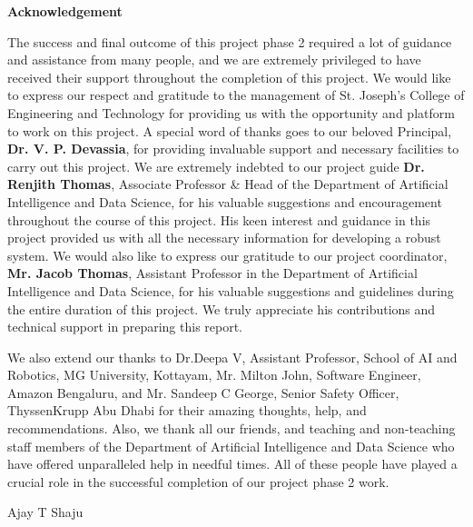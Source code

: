 {%
\newpage
\thispagestyle{empty}
\begin{center}
  \vspace*{1cm}
  \textbf{\large Acknowledgement}
\end{center}
The success and final outcome of this project phase 2 required a lot of guidance and assistance from many people, and we are extremely privileged to have received their support throughout the completion of this project. We would like to express our respect and gratitude to the management of St. Joseph’s College of Engineering and Technology for providing us with the opportunity and platform to work on this project. A special word of thanks goes to our beloved Principal, \textbf{Dr. V. P. Devassia}, for providing invaluable support and necessary facilities to carry out this project. We are extremely indebted to our project guide \textbf{Dr. Renjith Thomas}, Associate Professor \& Head of the Department of Artificial Intelligence and Data Science, for his valuable suggestions and encouragement throughout the course of this project. His keen interest and guidance in this project provided us with all the necessary information for developing a robust system. We would also like to express our gratitude to our project coordinator, \textbf{Mr. Jacob Thomas}, Assistant Professor in the Department of Artificial Intelligence and Data Science, for his valuable suggestions and guidelines during the entire duration of this project. We truly appreciate his contributions and technical support in preparing this report.

\noindent
We also extend our thanks to Dr.Deepa V, Assistant Professor, School of AI and Robotics, MG University, Kottayam, Mr. Milton John, Software Engineer, Amazon Bengaluru, and Mr. Sandeep C George, Senior Safety Officer, ThyssenKrupp Abu Dhabi for their amazing thoughts, help, and recommendations. Also, we thank all our friends, and teaching and non-teaching staff members of the Department of Artificial Intelligence and Data Science who have offered unparalleled help in needful times. All of these people have played a crucial role in the successful completion of our project phase 2 work.  \\

\begin{flushright}
    Ajay T Shaju
    

\end{flushright}}
